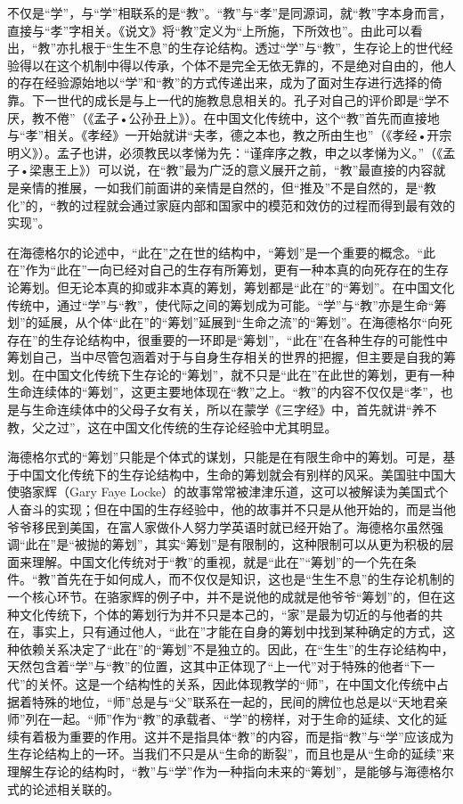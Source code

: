 \documentclass[UTF8, 12pt, a4paper]{ctexrep}
\begin{document}
不仅是“学”，与“学”相联系的是“教”。“教”与“孝”是同源词，就“教”字本身而言，直接与“孝”字相关。《说文》将“教”定义为“上所施，下所效也”。由此可以看出，“教”亦扎根于“生生不息”的生存论结构。透过“学”与“教”，生存论上的世代经验得以在这个机制中得以传承，个体不是完全无依无靠的，不是绝对自由的，他人的存在经验源始地以“学”和“教”的方式传递出来，成为了面对生存进行选择的倚靠。下一世代的成长是与上一代的施教息息相关的。孔子对自己的评价即是“学不厌，教不倦”（《孟子•公孙丑上》）。在中国文化传统中，这个“教”首先而直接地与“孝”相关。《孝经》一开始就讲“夫孝，德之本也，教之所由生也”（《孝经•开宗明义》）。孟子也讲，必须教民以孝悌为先：“谨痒序之教，申之以孝悌为义。”（《孟子•梁惠王上》）可以说，在“教”最为广泛的意义展开之前，“教”最直接的内容就是亲情的推展，一如我们前面讲的亲情是自然的，但“推及”不是自然的，是“教化”的，“教的过程就会通过家庭内部和国家中的模范和效仿的过程而得到最有效的实现”。

在海德格尔的论述中，“此在”之在世的结构中，“筹划”是一个重要的概念。“此在”作为“此在”一向已经对自己的生存有所筹划，更有一种本真的向死存在的生存论筹划。但无论本真的抑或非本真的筹划，筹划都是“此在”的“筹划”。在中国文化传统中，通过“学”与“教”，使代际之间的筹划成为可能。“学”与“教”亦是生命“筹划”的延展，从个体“此在”的“筹划”延展到“生命之流”的“筹划”。在海德格尔“向死存在”的生存论结构中，很重要的一环即是“筹划”，“此在”在各种生存的可能性中筹划自己，当中尽管包涵着对于与自身生存相关的世界的把握，但主要是自我的筹划。在中国文化传统下生存论的“筹划”，就不只是“此在”在此世的筹划，更有一种生命连续体的“筹划”，这更主要地体现在“教”之上。“教”的内容不仅仅是“孝”，也是与生命连续体中的父母子女有关，所以在蒙学《三字经》中，首先就讲“养不教，父之过”，这在中国文化传统的生存论经验中尤其明显。

海德格尔式的“筹划”只能是个体式的谋划，只能是在有限生命中的筹划。可是，基于中国文化传统下的生存论结构中，生命的筹划就会有别样的风采。美国驻中国大使骆家辉（Gary Faye Locke）的故事常常被津津乐道，这可以被解读为美国式个人奋斗的实现；但在中国的生存经验中，他的故事并不只是从他开始的，而是当他爷爷移民到美国，在富人家做仆人努力学英语时就已经开始了。海德格尔虽然强调“此在”是“被抛的筹划”，其实“筹划”是有限制的，这种限制可以从更为积极的层面来理解。中国文化传统对于“教”的重视，就是“此在”“筹划”的一个先在条件。“教”首先在于如何成人，而不仅仅是知识，这也是“生生不息”的生存论机制的一个核心环节。在骆家辉的例子中，并不是说他的成就是他爷爷“筹划”的，但在这种文化传统下，个体的筹划行为并不只是本己的，“家”是最为切近的与他者的共在，事实上，只有通过他人，“此在”才能在自身的筹划中找到某种确定的方式，这种依赖关系决定了“此在”的“筹划”不是独立的。因此，在“生生”的生存论结构中，天然包含着“学”与“教”的位置，这其中正体现了“上一代”对于特殊的他者“下一代”的关怀。这是一个结构性的关系，因此体现教学的“师”，在中国文化传统中占据着特殊的地位，“师”总是与“父”联系在一起的，民间的牌位也总是以“天地君亲师”列在一起。“师”作为“教”的承载者、“学”的榜样，对于生命的延续、文化的延续有着极为重要的作用。这并不是指具体“教”的内容，而是指“教”与“学”应该成为生存论结构上的一环。当我们不只是从“生命的断裂”，而且也是从“生命的延续”来理解生存论的结构时，“教”与“学”作为一种指向未来的“筹划”，是能够与海德格尔式的论述相关联的。
\end{document}
